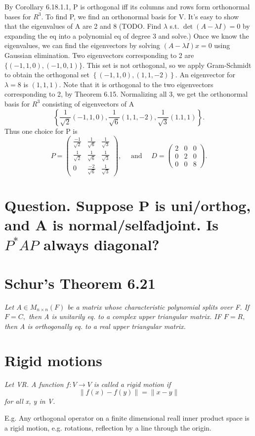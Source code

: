 \documentclass[12pt,english]{article}
\begin{document}
By Corollary 6.18.1.1, P is orthogonal iff its columns and rows form
orthonormal bases for $R^{3}.$ To find P, we find an orthonormal
basis for V. It's easy to show that the eigenvalues of A are 2 and
8 (TODO. Find $\lambda$ s.t. $\det(A-\lambda I)=0$ by expanding
the eq into a polynomial eq of degree 3 and solve.) Once we know the
eigenvalues, we can find the eigenvectors by solving $(A-\lambda I)x=0$
using Gaussian elimination. Two eigenvectors corresponding to 2 are
$\{(-1,1,0),(-1,0,1)\}.$ This set is not orthogonal, so we apply
Gram-Schmidt to obtain the orthogonal set $\left\{ \left(-1,1,0\right),(1,1,-2)\right\} .$
An eigenvector for $\lambda=8$ is $(1,1,1).$ Note that it is orthogonal
to the two eigenvectors corresponding to 2, by Theorem 6.15. Normalizing
all 3, we get the orthonormal basis for $R^{3}$ consisting of eigenvectors
of A
\[
\left\{ \frac{1}{\sqrt{2}}(-1,1,0),\frac{1}{\sqrt{6}}(1,1,-2),\frac{1}{\sqrt{3}}(1.1,1)\right\} .
\]
Thus one choice for P is
\[
P=\left(\begin{array}{ccc}
{\frac{-1}{\sqrt{2}}} & {\frac{1}{\sqrt{6}}} & {\frac{1}{\sqrt{3}}}\\
{\frac{1}{\sqrt{2}}} & {\frac{1}{\sqrt{6}}} & {\frac{1}{\sqrt{3}}}\\
{0} & {\frac{-2}{\sqrt{6}}} & {\frac{1}{\sqrt{3}}}
\end{array}\right),\quad\text{ and }\quad D=\left(\begin{array}{ccc}
{2} & {0} & {0}\\
{0} & {2} & {0}\\
{0} & {0} & {8}
\end{array}\right).
\]

\section{Question. Suppose P is uni/orthog, and A is normal/selfadjoint. Is
$P^{*}AP$ always diagonal?}

\section{Schur's Theorem 6.21}

\emph{Let $A\in M_{n\times n}(F)$ be a matrix whose characteristic
polynomial splits over F. If $F=C,$ then A is unitarily eq. to a
complex upper triangular matrix. IF $F=R,$ then A is orthogonally
eq. to a real upper triangular matrix.}

\section{Rigid motions}

\emph{Let VR. A function $f:V\longrightarrow V$ is called a rigid
motion if
\[
\|f(x)-f(y)\|=\|x-y\|
\]
for all x, y in V.}

E.g. Any orthogonal operator on a finite dimensional reall inner product
space is a rigid motion, e.g. rotations, reflection by a line through
the origin.
\end{document}
